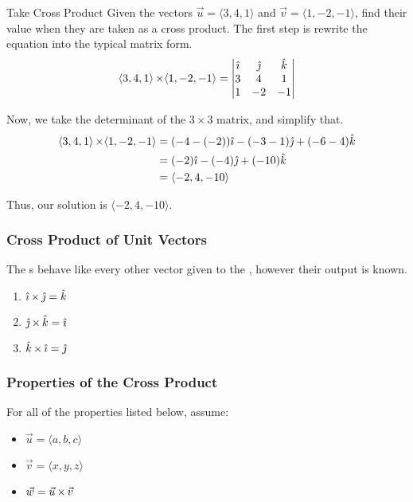 \begin{example}[Lecture 4]{Take Cross Product}
  Given the vectors $\vec{u} = \langle 3, 4, 1 \rangle$ and $\vec{v} = \langle 1, -2, -1 \rangle$, find their value when they are taken as a cross product.
  \tcblower{}
  The first step is rewrite the  equation into the typical matrix form.
  \begin{equation*}
    \langle 3, 4, 1 \rangle \operatorname{\times} \langle 1, -2, -1 \rangle =
    \begin{vmatrix}
      \hat{\imath} & \hat{\jmath} & \hat{k} \\
      3 & 4 & 1 \\
      1 & -2 & -1
    \end{vmatrix}
  \end{equation*}

  Now, we take the determinant of the $3 \times 3$ matrix, and simplify that.
  \begin{align*}
    \langle 3, 4, 1 \rangle \operatorname{\times} \langle 1, -2, -1 \rangle &= (-4 - (-2))\hat{\imath} - (-3 - 1)\hat{\jmath} + (-6 - 4) \hat{k} \\
                                                             &= (-2)\hat{\imath} - (-4)\hat{\jmath} + (-10)\hat{k} \\
                                                             &= \langle -2, 4, -10 \rangle
  \end{align*}

  Thus, our solution is $\langle -2, 4, -10 \rangle$.
\end{example}

\subsubsection{Cross Product of Unit Vectors}\label{subsubsec:Unit_Vector_Cross_Product}
The s behave like every other vector given to the , however their output is known.
\begin{enumerate}[noitemsep]
\item $\hat{\imath} \operatorname{\times} \hat{\jmath} = \hat{k}$
\item $\hat{\jmath} \operatorname{\times} \hat{k} = \hat{\imath}$
\item $\hat{k} \operatorname{\times} \hat{\imath} = \hat{\jmath}$
\end{enumerate}

\subsubsection{Properties of the Cross Product}\label{subsubsec:Cross_Product_Properties}
For all of the properties listed below, assume:
\begin{itemize}[noitemsep]
\item $\vec{u} = \langle a, b, c \rangle$
\item $\vec{v} = \langle x, y, z \rangle$
\item $\vec{w} = \vec{u} \operatorname{\times} \vec{v}$
\end{itemize}

